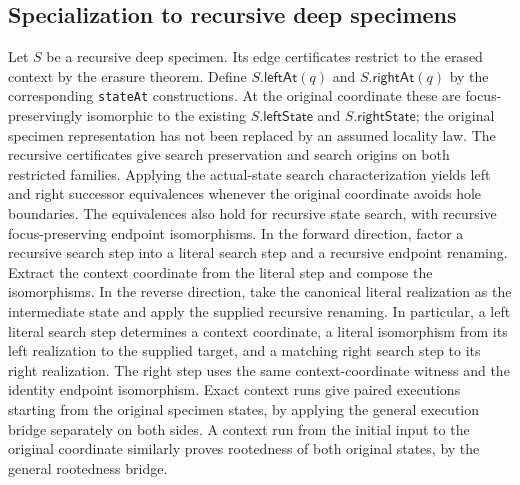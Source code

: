 \subsection{Specialization to recursive deep specimens}
Let $S$ be a recursive deep specimen. Its edge certificates restrict to the
erased context by the erasure theorem. Define $S.\mathsf{leftAt}(q)$ and
$S.\mathsf{rightAt}(q)$ by the corresponding \texttt{stateAt} constructions.
At the original coordinate these are focus-preservingly isomorphic to the
existing $S.\mathsf{leftState}$ and $S.\mathsf{rightState}$; the original
specimen representation has not been replaced by an assumed locality law.
The recursive certificates give search preservation and search origins on both
restricted families. Applying the actual-state search characterization yields
left and right successor equivalences whenever the original coordinate avoids
hole boundaries.
The equivalences also hold for recursive state search, with recursive
focus-preserving endpoint isomorphisms. In the forward direction, factor a
recursive search step into a literal search step and a recursive endpoint
renaming. Extract the context coordinate from the literal step and compose the
isomorphisms. In the reverse direction, take the canonical literal realization
as the intermediate state and apply the supplied recursive renaming.
In particular, a left literal search step determines a context coordinate,
a literal isomorphism from its left realization to the supplied target, and a
matching right search step to its right realization. The right step uses the
same context-coordinate witness and the identity endpoint isomorphism.
Exact context runs give paired executions starting from the original specimen
states, by applying the general execution bridge separately on both sides.
A context run from the initial input to the original coordinate similarly proves
rootedness of both original states, by the general rootedness bridge.

